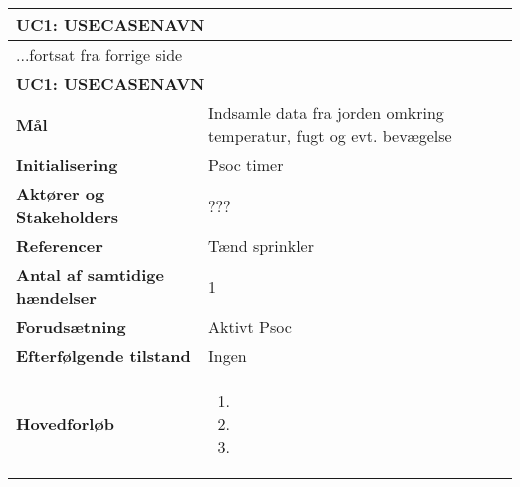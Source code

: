 \begin{center} \centering
	\begin{longtable}{|p{6cm}|p{8cm}|}  %
	\hline
		\multicolumn{2}{|l|}{\textbf{UC1: USECASENAVN}} \\\hline %
		\endfirsthead
		
		\multicolumn{2}{l}{...fortsat fra forrige side} \\ \hline %
		\multicolumn{2}{|l|}{\textbf{UC1: USECASENAVN}} \\\hline %
		\endhead	
		
		\textbf{Mål}								&Indsamle data fra jorden omkring temperatur, fugt og evt. bevægelse			\\\hline
		\textbf{Initialisering}					&Psoc timer			\\\hline
		\textbf{Aktører og Stakeholders}			&???			\\\hline
		\textbf{Referencer}						&Tænd sprinkler			\\\hline
		\textbf{Antal af samtidige hændelser}	&1			\\\hline
		\textbf{Forudsætning}					&Aktivt Psoc			\\\hline
		\textbf{Efterfølgende tilstand}			&Ingen			\\\hline
		\textbf{Hovedforløb}					
			&\begin{enumerate}
	
				\item %
				
				\item %
				
				\item %
	
			\end{enumerate}\\\hline
	\end{longtable}
	\label{UC1} 
\end{center}

